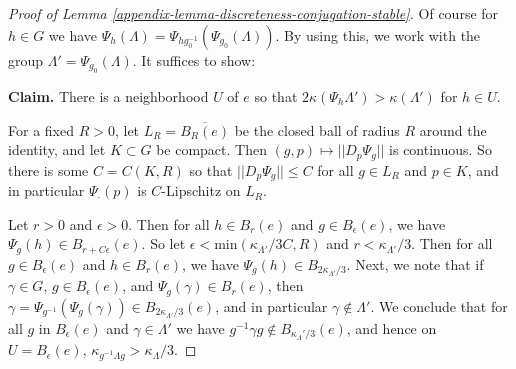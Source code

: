 \documentclass[12pt,a4paper]{amsart}
\theoremstyle{definition}
\theoremstyle{plain}
\numberwithin{equation}{section}
\begin{document}
\begin{proof}[Proof of Lemma \ref{appendix-lemma-discreteness-conjugation-stable}]
Of course for $h \in G$ we have $\Psi_h(\Lambda) = \Psi_{h g_0^{-1}} (\Psi_{g_0} (\Lambda)).$ By using this, we work with the group $\Lambda' = \Psi_{g_0}(\Lambda)$. It suffices to show:

\textbf{Claim.} There is a neighborhood $U$ of $e$ so that $2\kappa(\Psi_h\Lambda') > \kappa(\Lambda' ) $ for $h\in U$.

For a fixed $R > 0$, let $L_R = \overline{B_R(e)}$ be the closed ball of radius $R$ around the identity, and let $K \subset G$ be compact. Then $(g,p) \mapsto || D_p \Psi_g||$ is continuous. So there is some $C = C(K,R)$ so that $||D_p \Psi_g|| \leq C$ for all $g \in L_R$ and $p \in K$, and in particular $\Psi_{\cdot}(p)$ is $C$-Lipschitz on $L_R$.

Let $r > 0$ and $\epsilon > 0$. Then for all $h\in B_r(e)$ and $g \in B_\epsilon(e)$, we have $\Psi_g(h) \in B_{r + C\epsilon}(e)$. So let $\epsilon < \text{min}(\kappa_{\Lambda'}/3C, R)$ and $r< \kappa_{\Lambda'}/3$. Then for all $g \in B_\epsilon(e)$ and $h \in B_{r}(e)$, we have $\Psi_g(h) \in B_{2\kappa_{\Lambda'}/3}.$ Next, we note that if $\gamma \in G$, $g \in B_\epsilon(e)$, and $\Psi_g(\gamma) \in B_{r}(e)$, then $\gamma = \Psi_{g^{-1}}(\Psi_g(\gamma)) \in B_{2\kappa_{\Lambda'}/3}(e)$, and in particular $\gamma \notin \Lambda'$. We conclude that for all $g$ in $B_\epsilon(e)$ and $\gamma \in \Lambda'$ we have $g^{-1}\gamma g \notin B_{\kappa_{\Lambda}'/3}(e)$, and hence on $U = B_\epsilon(e)$, $\kappa_{g^{-1}\Lambda g} > \kappa_{\Lambda}/3$. \end{proof}



\end{document}
